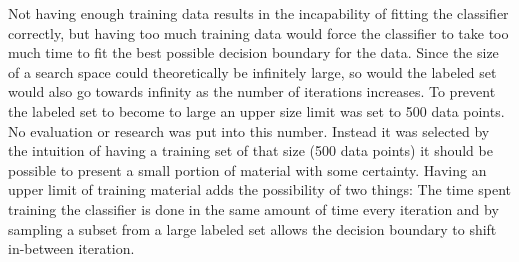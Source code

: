 Not having enough training data results in the incapability of fitting the classifier correctly, but having too much training data would force the classifier to take too much time to fit the best possible decision boundary for the data. Since the size of a search space could theoretically be infinitely large, so would the labeled set would also go towards infinity as the number of iterations increases. To prevent the labeled set to become to large an upper size limit was set to 500 data points. No evaluation or research was put into this number. Instead it was selected by the intuition of having a training set of that size (500 data points) it should be possible to present a small portion of material with some certainty. Having an upper limit of training material adds the possibility of two things: The time spent training the classifier is done in the same amount of time every iteration and by sampling a subset from a large labeled set allows the decision boundary to shift in-between iteration.

